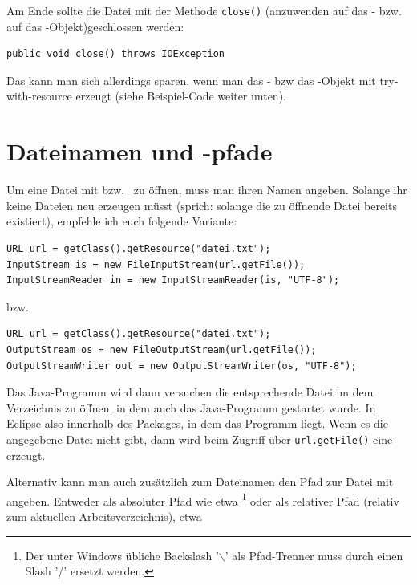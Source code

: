 Am Ende sollte die Datei mit der Methode \lstinline|close()| (anzuwenden auf das
- bzw. auf das
-Objekt)geschlossen werden:

\begin{lstlisting}
public void close() throws IOException
\end{lstlisting}

Das kann man sich allerdings sparen, wenn man das - bzw
das -Objekt mit try-with-resource erzeugt (siehe
Beispiel-Code weiter unten).

\section{Dateinamen und -pfade}

Um eine Datei mit  bzw.\  zu
öffnen, muss man ihren Namen angeben. Solange ihr keine Dateien neu erzeugen
müsst (sprich: solange die zu öffnende Datei bereits existiert), empfehle ich
euch folgende Variante:

\begin{lstlisting}
URL url = getClass().getResource("datei.txt");
InputStream is = new FileInputStream(url.getFile());
InputStreamReader in = new InputStreamReader(is, "UTF-8");
\end{lstlisting}

bzw.

\begin{lstlisting}
URL url = getClass().getResource("datei.txt");
OutputStream os = new FileOutputStream(url.getFile());
OutputStreamWriter out = new OutputStreamWriter(os, "UTF-8");
\end{lstlisting}

Das Java-Programm wird dann versuchen die entsprechende Datei im dem
Verzeichnis zu öffnen, in dem auch das Java-Programm gestartet wurde. In
Eclipse also innerhalb des Packages, in dem das Programm liegt. Wenn es die
angegebene Datei nicht gibt, dann wird beim Zugriff über
\lstinline|url.getFile()| eine  erzeugt.

Alternativ kann man auch zusätzlich zum Dateinamen den Pfad zur Datei mit
angeben. Entweder als absoluter Pfad wie etwa
\footnote{Der unter Windows
übliche Backslash '\ensuremath{\backslash}' als Pfad-Trenner muss durch einen
Slash '/' ersetzt werden.} oder als relativer Pfad (relativ zum aktuellen
Arbeitsverzeichnis), etwa 

